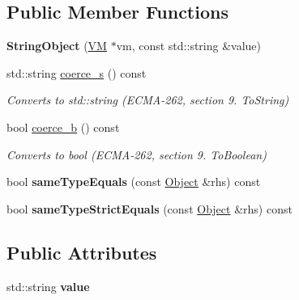 \subsection*{Public Member Functions}
\begin{DoxyCompactItemize}
\item 
\hypertarget{classjswf_1_1avm2_1_1_string_object_aa4c6d896b84872e7434cc8afbf6e1ea2}{{\bfseries String\+Object} (\hyperlink{classjswf_1_1avm2_1_1_v_m}{V\+M} $\ast$vm, const std\+::string \&value)}\label{classjswf_1_1avm2_1_1_string_object_aa4c6d896b84872e7434cc8afbf6e1ea2}

\item 
std\+::string \hyperlink{classjswf_1_1avm2_1_1_string_object_a65366b3e6efa1b0287d4ea0f8bbe4d66}{coerce\+\_\+s} () const 
\begin{DoxyCompactList}\small\item\em Converts to {\ttfamily std\+::string} (E\+C\+M\+A-\/262, section 9. {\itshape To\+String}) \end{DoxyCompactList}\item 
\hypertarget{classjswf_1_1avm2_1_1_string_object_a48b51daf7f5ff02acc473d866d2bb33a}{bool \hyperlink{classjswf_1_1avm2_1_1_string_object_a48b51daf7f5ff02acc473d866d2bb33a}{coerce\+\_\+b} () const }\label{classjswf_1_1avm2_1_1_string_object_a48b51daf7f5ff02acc473d866d2bb33a}

\begin{DoxyCompactList}\small\item\em Converts to {\ttfamily bool} (E\+C\+M\+A-\/262, section 9. {\itshape To\+Boolean}) \end{DoxyCompactList}\item 
\hypertarget{classjswf_1_1avm2_1_1_string_object_a757b765afd3500e8180b6ffd8b330d3d}{bool {\bfseries same\+Type\+Equals} (const \hyperlink{classjswf_1_1avm2_1_1_object}{Object} \&rhs) const }\label{classjswf_1_1avm2_1_1_string_object_a757b765afd3500e8180b6ffd8b330d3d}

\item 
\hypertarget{classjswf_1_1avm2_1_1_string_object_a87ec3b8687edc168c68db0b9991b676b}{bool {\bfseries same\+Type\+Strict\+Equals} (const \hyperlink{classjswf_1_1avm2_1_1_object}{Object} \&rhs) const }\label{classjswf_1_1avm2_1_1_string_object_a87ec3b8687edc168c68db0b9991b676b}

\end{DoxyCompactItemize}
\subsection*{Public Attributes}
\begin{DoxyCompactItemize}
\item 
\hypertarget{classjswf_1_1avm2_1_1_string_object_a1784308dee16c945743d37b6de8a2ba9}{std\+::string {\bfseries value}}\label{classjswf_1_1avm2_1_1_string_object_a1784308dee16c945743d37b6de8a2ba9}

\end{DoxyCompactItemize}
